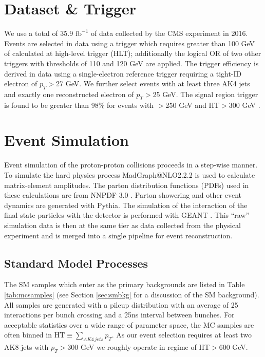 \section{Dataset \& Trigger}

We use a total of 35.9 $\mathrm{fb}^{-1}$ of data collected by the CMS experiment in 2016. Events are selected in data using a trigger which requires greater than 100 GeV of \ptmiss calculated at high-level trigger (HLT); additionally the logical OR of two other triggers with thresholds of 110 and 120 GeV are applied. The trigger efficiency is derived in data using a single-electron reference trigger requiring a tight-ID electron of $p_{T}$$>$27 GeV. We further select events with at least three AK4 jets and exactly one reconstructed electron of $p_{T}$$>$25 GeV. The signal region trigger is found to be greater than 98\% for events with \ptmiss$>$250 GeV and HT$>$300 GeV \cite{CMS-SUS-16-033}.

\section{Event Simulation}

Event simulation of the proton-proton collisions proceeds in a step-wise manner.
To simulate the hard physics process MadGraph@NLO2.2.2 \cite{Alwall:2014hca} is used to calculate matrix-element amplitudes. The parton distribution functions (PDFs) used in these calculations are from NNPDF 3.0 \cite{Ball:2014uwa}.
Parton showering and other event dynamics are generated with Pythia.
The simulation of the interaction of the final state particles with the detector is performed with GEANT \cite{Agostinelli:2002hh}.
This ``raw'' simulation data is then at the same tier as data collected from the physical experiment and is merged into a single pipeline for event reconstruction.

\subsection{Standard Model Processes}
\label{sec:smp}

The SM samples which enter as the primary backgrounds are listed in Table \ref{tab:mcsamples} (see Section \ref{sec:smbkg} for a discussion of the SM background). All samples are generated with a pileup distribution with an average of 25 interactions per bunch crossing and a 25ns interval between bunches. For acceptable statistics over a wide range of parameter space, the MC samples are often binned in $\mathrm{HT}\equiv\sum_{AK4\,jets}p_{T}$. As our event selection requires at least two AK8 jets with $p_{T}$$>$300 GeV we roughly operate in regime of HT$>$600 GeV.

